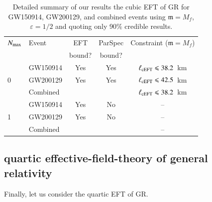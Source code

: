 \documentclass[twocolumn,
               prd,
               aps,
               superscriptaddress,
               tightenlines,
               nofootinbib,
               eqsecnum,
               amsfonts,
               amsmath,
               longbibliography]{revtex4-1}
\newcommand{\gm}{\mathfrak{m}}
\begin{document}
\begin{table}[h]
\begin{tabular}{l l c c c}
\hline
\hline
$N_{\rm max}$ & Event & EFT    & ParSpec & Constraint ($\gm = M_{f}$) \\
              &       & bound? & bound?  &                            \\
\hline
  & GW150914  & Yes & Yes &  $\ell_{\rm cEFT} \leqslant 38.2$~km \\
0 & GW200129  & Yes & Yes &  $\ell_{\rm cEFT} \leqslant 42.5$~km \\
  & Combined  &     &     &  \cellcolor{black!10}$\ell_{\rm cEFT} \leqslant 38.2$~km \\
\hline
  & GW150914  & Yes  & No  &  -- \\
1 & GW200129  & Yes  & No  &  -- \\
  & Combined  &      &     &  -- \\
\hline
\hline
\end{tabular}
\caption{Detailed summary of our results the cubic EFT of GR for GW150914, GW200129, and
combined events using $\gm = M_{f}$, $\varepsilon = 1/2$ and quoting only 90\% credible results.
}
\label{tab:summary_ceft}
\end{table}

\subsection{quartic effective-field-theory of general relativity}
\label{sec:results_qeft}

Finally, let us consider the quartic EFT of GR.
\end{document}
